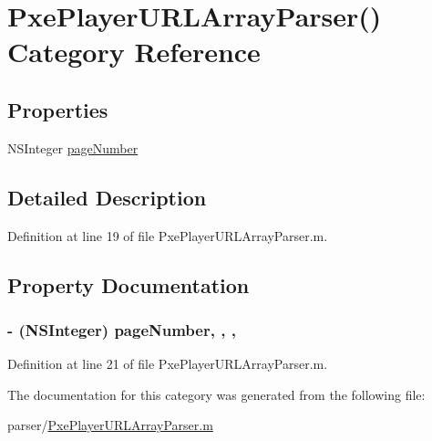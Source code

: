 \hypertarget{category_pxe_player_u_r_l_array_parser_07_08}{\section{Pxe\-Player\-U\-R\-L\-Array\-Parser() Category Reference}
\label{category_pxe_player_u_r_l_array_parser_07_08}
}
\subsection*{Properties}
\begin{DoxyCompactItemize}
\item 
N\-S\-Integer \hyperlink{category_pxe_player_u_r_l_array_parser_07_08_aa35d708d3e1d7ebf08cfab204038ef13}{page\-Number}
\end{DoxyCompactItemize}


\subsection{Detailed Description}


Definition at line 19 of file Pxe\-Player\-U\-R\-L\-Array\-Parser.\-m.



\subsection{Property Documentation}
\hypertarget{category_pxe_player_u_r_l_array_parser_07_08_aa35d708d3e1d7ebf08cfab204038ef13}{
\subsubsection[{page\-Number}]{\setlength{\rightskip}{0pt plus 5cm}-\/ (N\-S\-Integer) page\-Number\hspace{0.3cm}{\ttfamily [read]}, {\ttfamily [write]}, {\ttfamily [nonatomic]}, {\ttfamily [assign]}}}\label{category_pxe_player_u_r_l_array_parser_07_08_aa35d708d3e1d7ebf08cfab204038ef13}


Definition at line 21 of file Pxe\-Player\-U\-R\-L\-Array\-Parser.\-m.



The documentation for this category was generated from the following file\-:\begin{DoxyCompactItemize}
\item 
parser/\hyperlink{_pxe_player_u_r_l_array_parser_8m}{Pxe\-Player\-U\-R\-L\-Array\-Parser.\-m}\end{DoxyCompactItemize}
